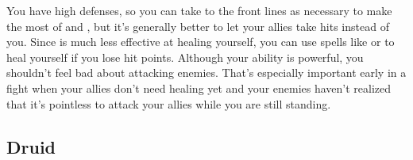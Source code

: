            You have high defenses, so you can take to the front lines as necessary to make the most of  and , but it's generally better to let your allies take hits instead of you.
            Since  is much less effective at healing yourself, you can use spells like  or  to heal yourself if you lose hit points.
            Although your  ability is powerful, you shouldn't feel bad about attacking enemies.
            That's especially important early in a fight when your allies don't need healing yet and your enemies haven't realized that it's pointless to attack your allies while you are still standing.

    \subsection{Druid}

